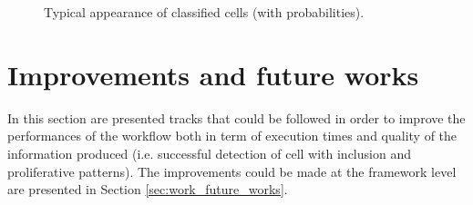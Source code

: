 \begin{figure}
	\center
	\caption{Typical appearance of classified cells (with probabilities).}
	\label{fig:classif_typical}
\end{figure}

\section{Improvements and future works}

In this section are presented tracks that could be followed in order to improve the performances of the workflow both in term of execution times and quality of the information produced (i.e. successful detection of cell with inclusion and proliferative patterns). The improvements could be made at the framework level are presented in Section \ref{sec:work_future_works}.

